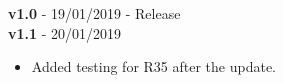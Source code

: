\textbf{v1.0} - 19/01/2019 - Release \\
\newline
\textbf{v1.1} - 20/01/2019 \\
\begin{itemize}
    \item Added testing for R35 after the update.
\end{itemize}
